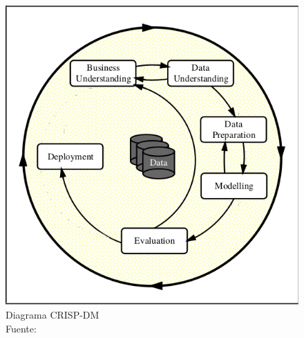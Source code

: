\begin{figure}[H]
    \centering
    \includegraphics[scale=0.3]{imagenes/crisp}
    \caption[Diagrama CRISP-DM]{Diagrama CRISP-DM\\Fuente: \citep{Wirth00crisp-dm:towards}}
\end{figure}